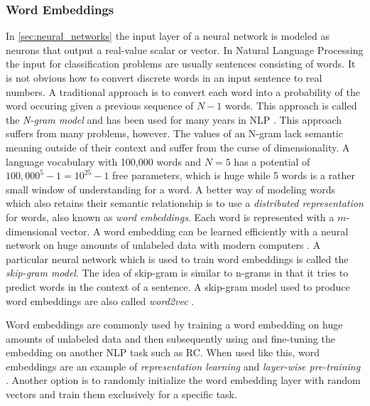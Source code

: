 \subsubsection{Word Embeddings}
\label{sec:word_embeddings}

In \autoref{sec:neural_networks} the input layer of a neural network is modeled as neurons that output a real-value scalar or vector. In Natural Language Processing the input for classification problems are usually sentences consisting of words. It is not obvious how to convert discrete words in an input sentence to real numbers. A traditional approach is to convert each word into a probability of the word occuring given a previous sequence of $N-1$ words. This approach is called the \emph{N-gram model} and has been used for many years in NLP \citep[chapter 4]{jurafsky1994}. This approach suffers from many problems, however. The values of an N-gram lack semantic meaning outside of their context and suffer from the curse of dimensionality. A language vocabulary with 100,000 words and $N=5$ has a potential of $100,000^5 - 1 = 10^{25} - 1$ free parameters, which is huge while 5 words is a rather small window of understanding for a word. A better way of modeling words which also retains their semantic relationship is to use a \emph{distributed representation} for words, also known as \emph{word embeddings}. Each word is represented with a $m$-dimensional vector. A word embedding can be learned efficiently with a neural network on huge amounts of unlabeled data with modern computers \cite{bengio2003}. A particular neural network which is used to train word embeddings is called the \emph{skip-gram model}. The idea of skip-gram is similar to n-grams in that it tries to predict words in the context of a sentence. A skip-gram model used to produce word embeddings are also called \emph{word2vec} \cite{mikolov2013}. 

Word embeddings are commonly used by training a word embedding on huge amounts of unlabeled data and then subsequently using and fine-tuning the embedding on another NLP task such as RC. When used like this, word embeddings are an example of \emph{representation learning} and \emph{layer-wise pre-training} \citep[Chapter 15]{dl_book}. Another option is to randomly initialize the word embedding layer with random vectors and train them exclusively for a specific task. 
